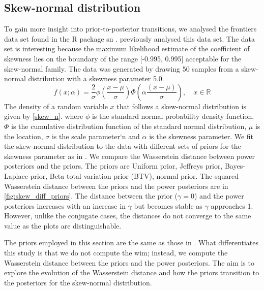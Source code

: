 \documentclass[12pt]{article}
\begin{document}
\FloatBarrier
\subsection{Skew-normal distribution}
To gain more insight into prior-to-posterior transitions, we analysed the frontiers data set found in the R package sn  \citep{azzalini2023}. \cite{ghaderinezhadWassersteinImpactMeasure2022} previously analysed this data set. The data set is interesting because the maximum likelihood estimate of the coefficient of skewness lies on the boundary of the range [-0.995, 0.995] acceptable for the skew-normal family. The data was generated by drawing 50 samples from a skew-normal distribution with a skewness parameter 5.0. 
\begin{equation}
    f(x; \alpha) = \frac{2}{\sigma} \phi \left( \frac{x - \mu}{\sigma} \right) \Phi \left( \alpha \frac{(x - \mu)}{\sigma} \right), \quad x \in \mathbb{R}
    \label{skew_n}
\end{equation}
The density of a random variable $x$ that follows a skew-normal distribution \citep{azzaliniClassD1985} is given by \cref{skew_n}.
where $\phi$ is the standard normal probability density function, $\Phi$ is the cumulative distribution function of the standard normal distribution, $\mu$ is the location, $\sigma$ is the scale parameter`n and $\alpha$ is the skewness parameter.
We fit the skew-normal distribution to the data with different sets of priors
for the skewness parameter as in
\cite{ghaderinezhadWassersteinImpactMeasure2022}. We compare the Wasserstein
distance between  power posteriors and the priors. The priors are
Uniform prior, Jeffreys prior, Bayes-Laplace prior,  Beta total variation prior (BTV), normal prior. The squared Wasserstein distance between the priors and the power posteriors
are in \cref{fig:skew_diff_priors}. The distance between
the prior ($\gamma=0$) and the power posteriors increases with an increase in
$\gamma$ but becomes stable as $\gamma$ approaches 1. However, unlike the conjugate cases, the distances do not converge to the same value as the plots are distinguishable.

The priors employed in this section are the same as those in  \citep{ghaderinezhadWassersteinImpactMeasure2022}. What differentiates this study is that we do not compute the \gls{wim}; instead, we compute the Wasserstein distance between the priors and the power posteriors. The aim is to explore the evolution of the Wasserstein distance and how the priors transition to the posteriors for the skew-normal distribution. 
\end{document}
